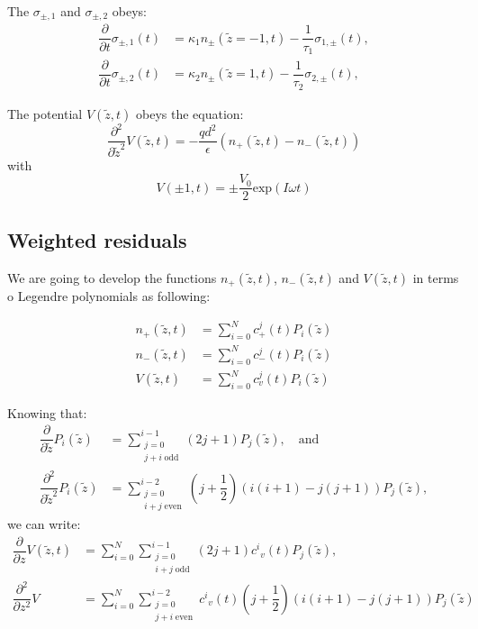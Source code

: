 \documentclass[amsmath,amsfonts,amssymb,superscriptaddress,showkeys,notitlepage,onecolumn]{revtex4-1}
\newcommand{\dpartial}[1]{\ensuremath{\dfrac{\partial}{\partial #1}}}
\newcommand{\ddpartial}[1]{\ensuremath{\dfrac{\partial^2}{\partial #1^2}}}
\newcommand{\Np}{\ensuremath{n_{+}(\tilde{z},t)}}
\newcommand{\Nm}{\ensuremath{n_{-}(\tilde{z},t)}}
\newcommand{\V}{\ensuremath{V(\tilde{z},t)}}
\newcommand{\legP}[1]{\ensuremath{P_{#1}(\tilde{z})}}
\begin{document}
The $\sigma_{\pm,1}$ and $\sigma_{\pm,2}$ obeys:
\begin{align}\nonumber
  \dfrac{\partial}{\partial t} \sigma_{\pm,1}(t)&=\kappa_1 n_{\pm}(\tilde{z}=-1,t)-\dfrac{1}{\tau_1} \sigma_{1,\pm}(t),\\
  \dfrac{\partial}{\partial t} \sigma_{\pm,2}(t)&=\kappa_2 n_{\pm}(\tilde{z}=1,t)-\dfrac{1}{\tau_2} \sigma_{2,\pm}(t),
\end{align}

The potential $V(\tilde{z},t)$ obeys the equation:
\begin{equation}
  \ddpartial{\tilde{z}} V(\tilde{z},t) =-\dfrac{q d^2}{\epsilon}(\Np-\Nm)
\end{equation}
with
\begin{equation}
  V\left(\pm 1 ,t \right)=\pm \dfrac{V_0}{2} \text{exp}(I \omega t)
\end{equation}

\subsection{Weighted residuals}

We are going to develop the functions $\Np$, $\Nm$ and $\V$ in terms o Legendre polynomials as following:

\begin{align}\nonumber
  \Np&=\sum_{i=0}^N  c^j_{+}(t) \legP{i}\\
  \Nm&=\sum_{i=0}^N  c^j_{-}(t) \legP{i}\\ \nonumber
  \V&=\sum_{i=0}^N   c^j_{v}(t) \legP{i}
\end{align}


Knowing that:
\begin{align}\nonumber
  \dpartial{\tilde{z}} \legP{i}&=\sum_{\substack{j=0 \\  j+i \; \text{odd}}}^{i-1} (2j+1) \legP{j}, \quad \text{and}\\
  \ddpartial{\tilde{z}} \legP{i}&=\sum_{\substack{j=0 \\  i+j \; \text{even}}}^{i-2} \left(j+\dfrac{1}{2} \right) \left(i(i+1)-j(j+1) \right) \legP{j},
\end{align}
we can write:
\begin{align}\label{eq:ddV}\nonumber
  \dpartial{z} \V&=\sum_{i=0}^{N} \sum_{\substack{j=0 \\  i+j \; \text{odd}}}^{i-1} (2j+1) {c^i}_v(t) \legP{j},\\
\ddpartial{z}  V&=\sum_{i=0}^{N} \sum_{\substack{j=0 \\  j+i \; \text{even}}}^{i-2} {c^i}_v(t) \left(j+\dfrac{1}{2} \right) \left(i(i+1)-j(j+1) \right)  \legP{j}
\end{align}
\end{document}
